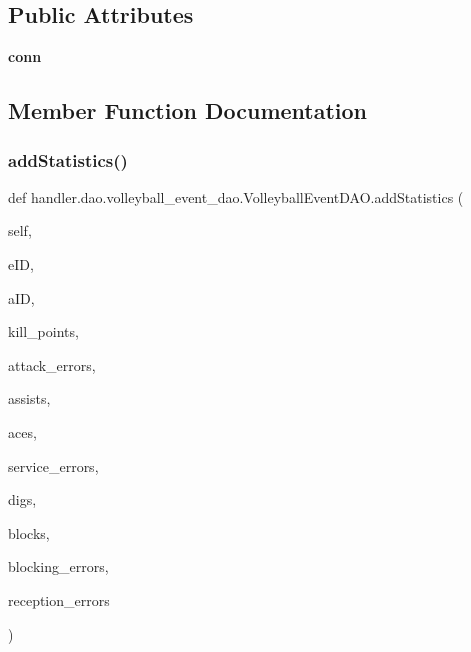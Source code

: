 \subsection*{Public Attributes}
\begin{DoxyCompactItemize}
\item 
\mbox{\label{classhandler_1_1dao_1_1volleyball__event__dao_1_1_volleyball_event_d_a_o_afb1bee8481027eeea6414b005c481430}} 
{\bfseries conn}
\end{DoxyCompactItemize}


\subsection{Member Function Documentation}
\mbox{\label{classhandler_1_1dao_1_1volleyball__event__dao_1_1_volleyball_event_d_a_o_acd35c968949cd0a32d124914433ec0d7}} 
\subsubsection{\texorpdfstring{add\+Statistics()}{addStatistics()}}
{\footnotesize\ttfamily def handler.\+dao.\+volleyball\+\_\+event\+\_\+dao.\+Volleyball\+Event\+D\+A\+O.\+add\+Statistics (\begin{DoxyParamCaption}\item[{}]{self,  }\item[{}]{e\+ID,  }\item[{}]{a\+ID,  }\item[{}]{kill\+\_\+points,  }\item[{}]{attack\+\_\+errors,  }\item[{}]{assists,  }\item[{}]{aces,  }\item[{}]{service\+\_\+errors,  }\item[{}]{digs,  }\item[{}]{blocks,  }\item[{}]{blocking\+\_\+errors,  }\item[{}]{reception\+\_\+errors }\end{DoxyParamCaption})}



